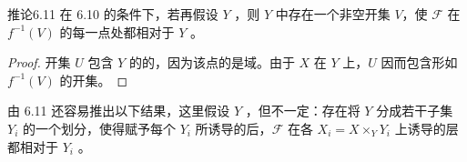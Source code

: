 \begin{SGAresult}{推论}{6.11}
在 6.10 的条件下，若再假设 $Y$ ，则 $Y$ 中存在一个非空开集 $V$，使 $\mathcal F$ 在 $f^{-1}(V)$ 的每一点处都相对于 $Y$ 。
\end{SGAresult}
\begin{proof}
开集 $U$ 包含 $Y$ 的的，因为该点的是域。由于 $X$ 在 $Y$ 上，$U$ 因而包含形如 $f^{-1}(V)$ 的开集。
\end{proof}
由 6.11 还容易推出以下结果，这里假设 $Y$ ，但不一定：存在将 $Y$ 分成若干子集 $Y_i$ 的一个划分，使得赋予每个 $Y_i$ 所诱导的后，$\mathcal F$ 在各 $X_i=X\times_Y Y_i$ 上诱导的层都相对于 $Y_i$ 。
